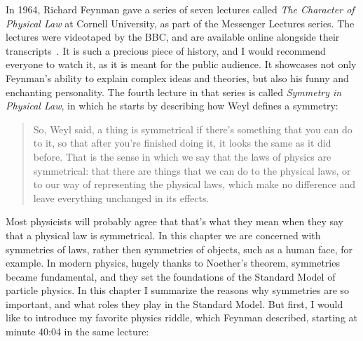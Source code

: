 In 1964, Richard Feynman gave a series of seven lectures called \emph{The Character of Physical Law} at Cornell University, as part of the Messenger Lectures series. The lectures were videotaped by the BBC, and are available online alongside their transcripts~\cite{Feynman1997-vo}. It is such a precious piece of history, and I would recommend everyone to watch it, as it is meant for the public audience. It showcases not only Feynman's ability to explain complex ideas and theories, but also his funny and enchanting personality. The fourth lecture in that series is called \emph{Symmetry in Physical Law}, in which he starts by describing how Weyl defines a symmetry:

\begin{quote}
So, Weyl said, a thing is symmetrical if there’s something that you can do to it, so that after you’re finished doing it, it looks the same as it did before. That is the sense in which we say that the laws of physics are symmetrical: that there are things that we can do to the physical laws, or to our way of representing the physical laws, which make no difference and leave everything unchanged in its effects.
\end{quote}

Most physicists will probably agree that that's what they mean when they say that a physical law is symmetrical. In this chapter we are concerned with symmetries of laws, rather then symmetries of objects, such as a human face, for example. In modern physics, hugely thanks to Noether's theorem, symmetries became fundamental, and they set the foundations of the Standard Model of particle physics. In this chapter I summarize the reasons why symmetries are so important, and what roles they play in the Standard Model. But first, I would like to introduce my favorite physics riddle, which Feynman described, starting at minute 40:04 in the same lecture:

